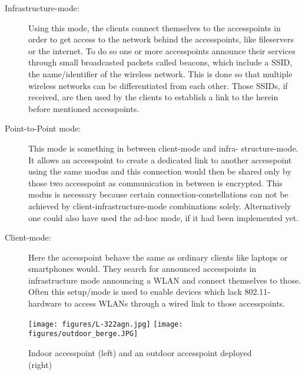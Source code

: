     \begin{description}
      \item[Infrastructure-mode:]
	Using this mode, the clients connect themselves to the accesspoints in order to get access to the network behind the accesspoints, like fileservers or the internet.
	To do so one or more accesspoints announce their services through small broadcasted packets called beacons, which include a \ac{SSID}, 
	the name/identifier of the wireless network. This is done 
	so that multiple wireless networks can be differentiated from each other. Those SSIDs, if received, are then used by the clients to
	establish a link to the herein before mentioned accesspoints.

      \item [Point-to-Point mode:]
	This mode is something in between client-mode and infra-
	structure-mode. 
	It allows an accesspoint to create a dedicated link to another accesspoint using the 	same modus and this connection would then be shared only by those two accesspoint
	as communication in between is encrypted. 
	This modus is necessary because certain connection-constellations can not be achieved by client-infrastructure-mode combinations solely.
	Alternatively one could also have used the ad-hoc mode, if it had been implemented yet.
	
      \item [Client-mode:]
	Here the accesspoint behave the same as ordinary clients like laptops or smartphones would.
	They search for announced accesspoints in infrastructure mode announcing a \ac{WLAN} and connect themselves to those.
	Often this setup/mode is used to enable devices which lack 802.11-hardware to access WLANs through a wired link to those accesspoints.
    \end{description}
    
    \begin{figure}[bh!]
      \centerline{
	\texttt{[image: figures/L-322agn.jpg]}
	\texttt{[image: figures/outdoor\_berge.JPG]}
      }
      \caption{Indoor accesspoint (left) and an outdoor accesspoint deployed (right) \cite{lancom}}
      \label{fig:L-322agn}
    \end{figure}
    
    \newpage
     
